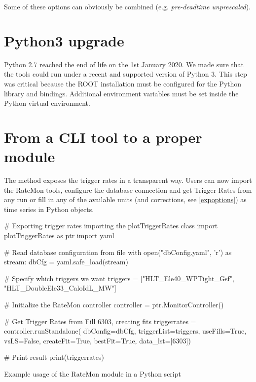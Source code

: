 Some of these options can obviously be combined (e.g. \textit{pre-deadtime unprescaled}).

\section{Python3 upgrade}

Python 2.7 reached the end of life on the 1st January 2020. We made sure \cite{Python3migration4MergeRequestsCMSTSGFOGratemonGitLab-2020-10-07} that the tools could run under a recent and supported version of Python 3. This step was critical because the ROOT installation must be configured for the Python library and bindings. Additional environment variables must be set inside the Python virtual environment.

\section{From a CLI tool to a proper module}

The  method \cite{RestructuretheplotTriggerRatescripttobeusedasamodule7MergeRequestsCMSTSGFOGratemonGitLab-2020-10-07} exposes the trigger rates in a transparent way. Users can now import the RateMon tools, configure the database connection and get Trigger Rates from any run or fill in any of the available units (and corrections, see \ref{expoptions}) as time series in Python objects.


\begin{listing}[ht]
\begin{pythoncode}
# Exporting trigger rates importing the plotTriggerRates class
import plotTriggerRates as ptr
import yaml

# Read database configuration from file
with open("dbConfig.yaml", 'r') as stream:
    dbCfg = yaml.safe_load(stream)

# Specify which triggers we want
triggers = ["HLT_Ele40_WPTight_Gsf",
              "HLT_DoubleEle33_CaloIdL_MW"]

# Initialize the RateMon controller
controller = ptr.MonitorController()

# Get Trigger Rates from Fill 6303, creating fits
triggerrates = controller.runStandalone(
                         dbConfig=dbCfg,
                         triggerList=triggers,
                         useFills=True,
                         vsLS=False,
                         createFit=True,
                         bestFit=True,
                         data_lst=[6303])

# Print result
print(triggerrates)
\end{pythoncode}
\caption{Example usage of the RateMon module in a Python script}
\end{listing}

